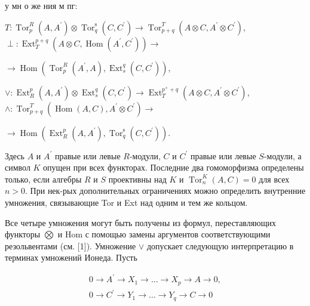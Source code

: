 \documentclass[10pt]{article}
\begin{document}
у мн о же ния м пг:



$T: \operatorname{Tor}_{p}^{R}\left(A, A^{\prime}\right) \otimes \operatorname{Tor}_{q}^{\mathrm{s}}\left(C, C^{\prime}\right) \longrightarrow \operatorname{Tor}_{p+q}^{T}\left(A \otimes C, A^{\prime} \otimes C^{\prime}\right)$, $\perp: \operatorname{Ext}_{T}^{p+q}\left(A \otimes C, \operatorname{Hom}\left(A^{\prime}, C^{\prime}\right)\right) \longrightarrow$



$\longrightarrow \operatorname{Hom}\left(\operatorname{Tor}_{p}^{R}\left(A^{\prime}, A\right), \operatorname{Ext}_{s}^{q}\left(C, C^{\prime}\right)\right)$,



$\vee: \operatorname{Ext}_{R}^{p}\left(A, A^{\prime}\right) \otimes \operatorname{Ext}_{s}^{q}\left(C, C^{\prime}\right) \longrightarrow \operatorname{Ext}_{T}^{p^{+}+q}\left(A \otimes C, A^{\prime} \otimes C^{\prime}\right)$, $\wedge: \operatorname{Tor}_{p+q}^{T}\left(\operatorname{Hom}(A, C), A^{\prime} \otimes C^{\prime}\right) \longrightarrow$



$\longrightarrow \operatorname{Hom}\left(\operatorname{Ext}_{R}^{p}\left(A, A^{\prime}\right), \operatorname{Tor}_{q}^{\mathrm{s}}\left(C, C^{\prime}\right)\right)$.



Здесь $A$ и $A^{\prime}$ правые или левые $R$-модули, $C$ и $C^{\prime}$ правые или левые $S$-модули, а символ $K$ опущен при всех функторах. Последние два гомоморфизма определены только, если алгебры $R$ и $S$ проективны над $K$ и $\operatorname{Tor}_{n}^{K}(A, C)=0$ для всех $n>0$. При нек-рых дополнительных ограничениях можно определить внутренние умножения, связывающие Tor и Ext над одним и тем же кольцом.



Все четыре умножения могут быть получены из формул, переставляющих функторы $\bigotimes$ и Hom с помощью замены аргументов соответствующими резольвентами (см. [1]). Умножение $\vee$ допускает следующую интерпретацию в терминах умножений Ионеда. Пусть



\[

\begin{gathered}

0 \longrightarrow A^{\prime} \longrightarrow X_{1} \longrightarrow \ldots \longrightarrow X_{p} \longrightarrow A \longrightarrow 0, \\

0 \longrightarrow C^{\prime} \longrightarrow Y_{1} \longrightarrow \ldots \rightarrow Y_{q} \rightarrow C \longrightarrow 0

\end{gathered}

\]
\end{document}
